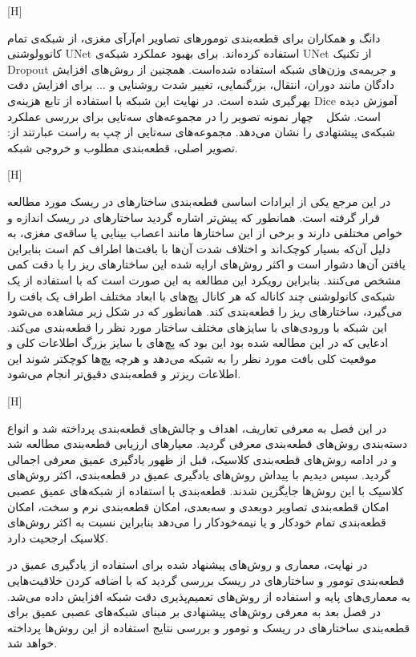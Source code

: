 [H]

دانگ و همکاران  برای قطعه‌بندی تومورهای تصاویر ام‌آرآی مغزی، از شبکه‌ی تمام کانوولوشنی UNet استفاده کرده‌اند. برای بهبود عملکرد شبکه‌ی UNet از تکنیک Dropout و جریمه‌ی وزن‌های شبکه استفاده شده‌است. همچنین از روش‌های افزایش دادگان مانند دوران، انتقال، بزرگنمایی، تغییر شدت روشنایی و ... برای افزایش دقت بهر‌گیری شده است. در نهایت این شبکه با استفاده از تابع هزینه‌ی Dice آموزش دیده است. شکل ~ چهار نمونه تصویر را در مجموعه‌های سه‌تایی برای بررسی عملکرد شبکه‌ی پیشنهادی را نشان می‌دهد. مجموعه‌های سه‌تایی از چپ به راست عبارتند از: تصویر اصلی، قطعه‌بندی مطلوب و خروجی شبکه.

[H]

در این مرجع  یکی از ایرادات اساسی قطعه‌بندی ساختارهای در ریسک مورد مطالعه قرار گرفته است. همانطور که پیش‌تر اشاره گردید ساختارهای در ریسک اندازه و خواص مختلفی دارند و برخی از این ساختارها مانند اعصاب بینایی یا ساقه‌ی مغزی، به دلیل آن‌که بسیار کوچک‌اند و اختلاف شدت آن‌ها با بافت‌ها اطراف کم است بنابراین یافتن آن‌ها دشوار است و اکثر روش‌های ارایه شده این ساختارهای ریز را با دقت کمی مشخص می‌کنند. بنابراین رویکرد این مطالعه به این صورت است که با استفاده از یک شبکه‌ی کانولوشنی چند کاناله که هر کانال پچ‌های با ابعاد مختلف اطراف یک بافت را می‌گیرد، ساختارهای ریز را قطعه‌بندی کند. همانطور که در شکل زیر مشاهده می‌شود این شبکه با ورودی‌های با سایزهای مختلف ساختار مورد نظر را قطعه‌بندی می‌کند. ادعایی که در این مطالعه شده بود این بود که پچ‌های با سایز بزرگ اطلاعات کلی و موقعیت کلی بافت مورد نظر را به شبکه می‌دهد و هرچه پچ‌ها کوچکتر شوند این اطلاعات ریزتر و قطعه‌بندی دقیق‌تر انجام می‌شود.

[H]

در این فصل به معرفی تعاریف، اهداف و چالش‌های قطعه‌بندی پرداخته شد و انواع دسته‌بندی روش‌های قطعه‌بندی معرفی گردید. معیارهای ارزیابی قطعه‌بندی مطالعه شد و در ادامه روش‌های قطعه‌بندی کلاسیک، قبل از ظهور یادگیری عمیق معرفی اجمالی گردید. سپس دیدیم با پیداش روش‌های یادگیری عمیق در قطعه‌بندی، اکثر روش‌های کلاسیک با این روش‌ها جایگزین شدند. قطعه‌بندی با استفاده از شبکه‌های عمیق عصبی امکان قطعه‌بندی تصاویر دو‌بعدی و سه‌بعدی، امکان قطعه‌بندی نرم و سخت، امکان ‌قطعه‌بندی تمام خودکار و یا نیمه‌خودکار را می‌دهد بنابراین نسبت به اکثر روش‌های کلاسیک ارجحیت دارد.

در نهایت، معماری و روش‌های پیشنهاد شده برای استفاده از یادگیری عمیق در قطعه‌بندی تومور و ساختارهای در ریسک بررسی گردید که با اضافه کردن خلاقیت‌هایی به معماری‌های پایه و استفاده از روش‌های تعمیم‌پذیری دقت شبکه افزایش داده می‌شد. در فصل بعد به معرفی روش‌های پیشنهادی بر مبنای شبکه‌های عصبی عمیق برای قطعه‌بندی ساختارهای در ریسک و تومور و بررسی نتایج استفاده از این روش‌ها پرداخته خواهد شد.

